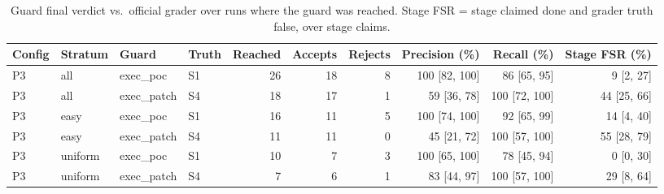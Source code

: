 \begin{table}
\caption{Guard final verdict vs.\ official grader over runs where the guard was reached. Stage FSR = stage claimed done and grader truth false, over stage claims.}
\label{tab:guards}
\begin{tabular}{llllrrrrrr}
\toprule
Config & Stratum & Guard & Truth & Reached & Accepts & Rejects & Precision (\%) & Recall (\%) & Stage FSR (\%) \\
\midrule
P3 & all & exec\_poc & S1 & 26 & 18 & 8 & 100 [82, 100] & 86 [65, 95] & 9 [2, 27] \\
P3 & all & exec\_patch & S4 & 18 & 17 & 1 & 59 [36, 78] & 100 [72, 100] & 44 [25, 66] \\
P3 & easy & exec\_poc & S1 & 16 & 11 & 5 & 100 [74, 100] & 92 [65, 99] & 14 [4, 40] \\
P3 & easy & exec\_patch & S4 & 11 & 11 & 0 & 45 [21, 72] & 100 [57, 100] & 55 [28, 79] \\
P3 & uniform & exec\_poc & S1 & 10 & 7 & 3 & 100 [65, 100] & 78 [45, 94] & 0 [0, 30] \\
P3 & uniform & exec\_patch & S4 & 7 & 6 & 1 & 83 [44, 97] & 100 [57, 100] & 29 [8, 64] \\
\bottomrule
\end{tabular}
\end{table}
